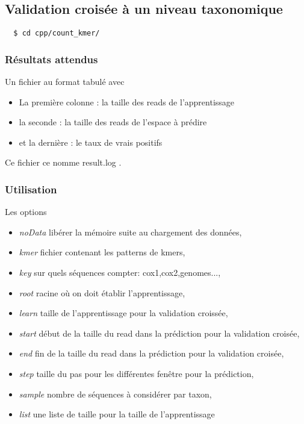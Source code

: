\subsection{Validation croisée à un niveau taxonomique}
\label{graph}

\begin{verbatim}
  $ cd cpp/count_kmer/
\end{verbatim}

\subsubsection{Résultats attendus}

Un fichier au format tabulé avec
\begin{itemize}
  \item La première colonne : la taille des reads de l'apprentissage
  \item la seconde : la taille des reads de l'espace à prédire
  \item et la dernière : le taux de vrais positifs 
\end{itemize}

Ce fichier ce nomme result.log .

\subsubsection{Utilisation}
Les options
\begin{itemize}
		\item \textit{noData}              libérer la mémoire suite au chargement des données,
		\item \textit{kmer}                fichier contenant les patterns de kmers,
		\item \textit{key}                 sur quels séquences compter: cox1,cox2,genomes...,
		\item \textit{root}                racine où on doit établir l’apprentissage,
		\item \textit{learn}               taille de l'apprentissage pour la validation croissée,
		\item \textit{start}               début de la taille du read dans la prédiction pour la validation croisée,
		\item \textit{end}                 fin de la taille du read dans la prédiction pour la validation croisée,
		\item \textit{step}                taille du pas pour les différentes fenêtre pour la prédiction,
		\item \textit{sample}              nombre de séquences à considérer par taxon,
		\item \textit{list}                une liste de taille pour la taille de l'apprentissage
\end{itemize}
~\\


